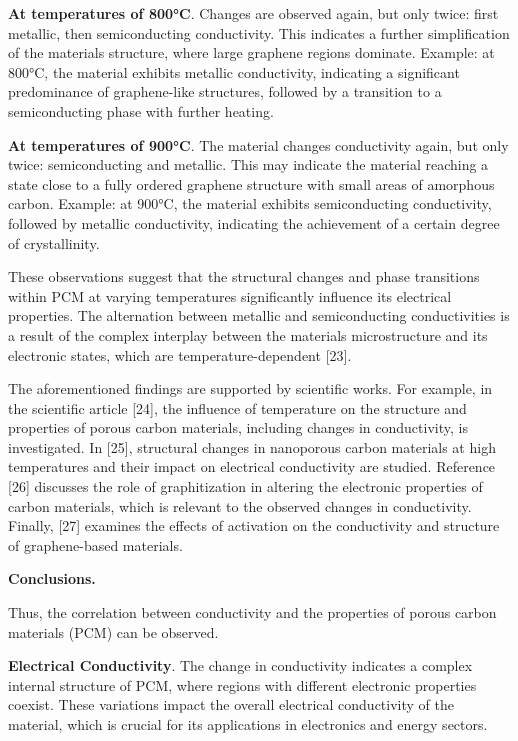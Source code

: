 {\bfseries At temperatures of 800°C}. Changes are observed again, but only
twice: first metallic, then semiconducting conductivity. This indicates
a further simplification of the material\textquotesingle s structure,
where large graphene regions dominate. Example: at 800°C, the material
exhibits metallic conductivity, indicating a significant predominance of
graphene-like structures, followed by a transition to a semiconducting
phase with further heating.

{\bfseries At temperatures of 900°C}. The material changes conductivity
again, but only twice: semiconducting and metallic. This may indicate
the material reaching a state close to a fully ordered graphene
structure with small areas of amorphous carbon. Example: at 900°C, the
material exhibits semiconducting conductivity, followed by metallic
conductivity, indicating the achievement of a certain degree of
crystallinity.

These observations suggest that the structural changes and phase
transitions within PCM at varying temperatures significantly influence
its electrical properties. The alternation between metallic and
semiconducting conductivities is a result of the complex interplay
between the material\textquotesingle s microstructure and its electronic
states, which are temperature-dependent {[}23{]}.

The aforementioned findings are supported by scientific works. For
example, in the scientific article {[}24{]}, the influence of
temperature on the structure and properties of porous carbon materials,
including changes in conductivity, is investigated. In {[}25{]},
structural changes in nanoporous carbon materials at high temperatures
and their impact on electrical conductivity are studied. Reference
{[}26{]} discusses the role of graphitization in altering the electronic
properties of carbon materials, which is relevant to the observed
changes in conductivity. Finally, {[}27{]} examines the effects of
activation on the conductivity and structure of graphene-based
materials.

{\bfseries Conclusions.}

Thus, the correlation between conductivity and the properties of porous
carbon materials (PCM) can be observed.

{\bfseries Electrical Conductivity}. The change in conductivity indicates a
complex internal structure of PCM, where regions with different
electronic properties coexist. These variations impact the overall
electrical conductivity of the material, which is crucial for its
applications in electronics and energy sectors.

